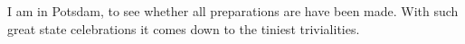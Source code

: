 I am in Potsdam, to see whether all preparations are have been made. With such great state celebrations it comes down to the tiniest trivialities. 